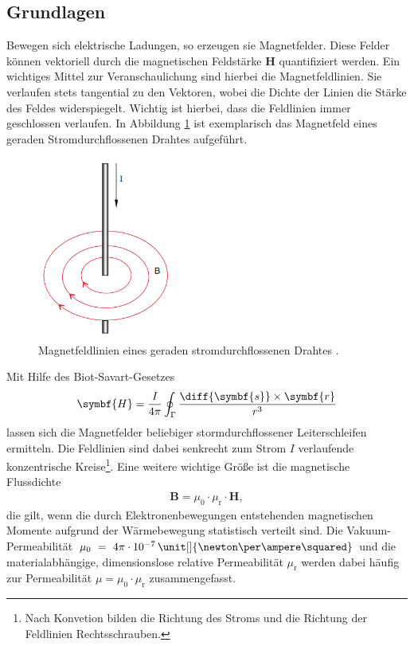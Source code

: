 \subsection{Grundlagen}
Bewegen sich elektrische Ladungen, so erzeugen sie Magnetfelder.
Diese Felder können vektoriell durch die magnetischen Feldstärke $\symbf{H}$ quantifiziert werden.
Ein wichtiges Mittel zur Veranschaulichung sind hierbei die Magnetfeldlinien.
Sie verlaufen stets tangential zu den Vektoren, wobei die Dichte der Linien die Stärke des Feldes widerspiegelt.
Wichtig ist hierbei, dass die Feldlinien immer geschlossen verlaufen.
In Abbildung \ref{fig:ger_stromdurchfl_draht} ist exemplarisch das Magnetfeld eines geraden Stromdurchflossenen Drahtes aufgeführt.
\begin{figure}[H]
    \centering
    \includegraphics*[height = 6cm]{./abbildungen/stromdurchfl_gerader_draht.png}
    \caption[]{Magnetfeldlinien eines geraden stromdurchflossenen Drahtes \cite[S. 86]{demtroeder2}.}
    \label{fig:ger_stromdurchfl_draht}
\end{figure}
%
\noindent
Mit Hilfe des Biot-Savart-Gesetzes 
\begin{align}
    \label{eq:biot_savart}
    \symbf{H} = \frac{I}{4 \pi} \oint_\Gamma \frac{\diff{\symbf{s}} \times \symbf{r}}{r^3}
\end{align}
lassen sich die Magnetfelder beliebiger stormdurchflossener Leiterschleifen \Gamma ermitteln.
Die Feldlinien sind dabei senkrecht zum Strom $I$ verlaufende konzentrische Kreise\footnote{Nach Konvetion
bilden die Richtung des Stroms und die Richtung der Feldlinien Rechtsschrauben.}.
\noindent
Eine weitere wichtige Größe ist die magnetische Flussdichte
\begin{align}
    \label{eq:B_mu_H}
    \symbf{B} = \mu_0 \cdot \mu_\text{r} \cdot \symbf{H},
\end{align}
die gilt, wenn die durch Elektronenbewegungen entstehenden magnetischen Momente aufgrund der 
Wärmebewegung statistisch verteilt sind.
Die Vakuum-Permeabilität $\mu_0~=~4 \pi \cdot 10^{-7} \, \unit[]{\newton\per\ampere\squared}$ und die materialabhängige, dimensionslose relative Permeabilität $\mu_\text{r}$
werden dabei häufig zur Permeabilität $\mu = \mu_0 \cdot \mu_\text{r}$ zusammengefasst.

